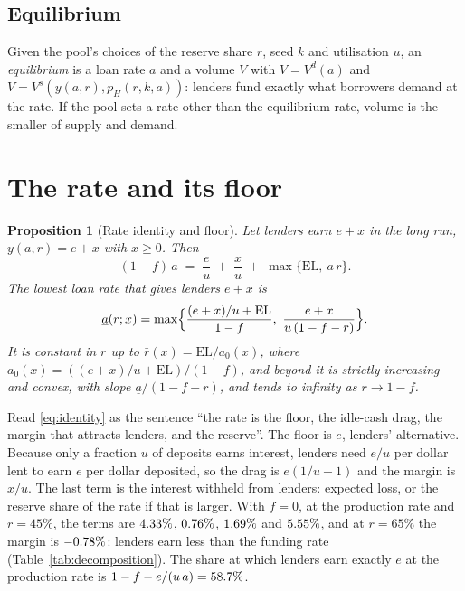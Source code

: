 \documentclass[preprint,11pt,authoryear]{elsarticle}
\newtheorem{proposition}{Proposition}
\theoremstyle{definition}
\newcommand{\EL}{\mathrm{EL}}
\begin{document}
\subsection{Equilibrium}

Given the pool's choices of the reserve share $r$, seed $k$ and utilisation $u$, an
\emph{equilibrium} is a loan rate $a$ and a volume $V$ with $V=V^d(a)$ and $V=V^s(y(a,r),p_H(r,k,a))$:
lenders fund exactly what borrowers demand at the rate. If the pool sets a rate other than the
equilibrium rate, volume is the smaller of supply and demand.

\section{The rate and its floor}\label{sec:floor}

\begin{proposition}[Rate identity and floor]\label{prop:identity}
Let lenders earn $e+x$ in the long run, $y(a,r)=e+x$ with $x\ge0$. Then
\begin{equation}\label{eq:identity}
  (1-f)\,a\;=\;\frac{e}{u}\;+\;\frac{x}{u}\;+\;\max\{\EL,\ a\,r\}.
\end{equation}
The lowest loan rate that gives lenders $e+x$ is
\begin{equation}\label{eq:floor}
  \underline a(r;x)=\max\Bigl\{\frac{(e+x)/u+\EL}{1-f},\ \frac{e+x}{u\,(1-f-r)}\Bigr\}.
\end{equation}
It is constant in $r$ up to $\bar r(x)=\EL/a_0(x)$, where $a_0(x)=((e+x)/u+\EL)/(1-f)$, and beyond it
is strictly increasing and convex, with slope $\underline a/(1-f-r)$, and tends to infinity as
$r\to 1-f$.
\end{proposition}

Read \eqref{eq:identity} as the sentence ``the rate is the floor, the idle-cash drag, the margin that
attracts lenders, and the reserve''. The floor is $e$, lenders' alternative. Because only a fraction $u$
of deposits earns interest, lenders need $e/u$ per dollar lent to earn $e$ per dollar deposited, so the
drag is $e(1/u-1)$ and the margin is $x/u$. The last term is the interest withheld from lenders: expected
loss, or the reserve share of the rate if that is larger. With $f=0$, at the production rate and $r=45\%$,
the terms are $4.33\%$, $0.76\%$, $1.69\%$ and $5.55\%$, and at
$r=65\%$ the margin is $-0.78\%$: lenders earn less than the funding rate
(Table~\ref{tab:decomposition}). The share at which lenders earn exactly $e$ at the production rate is
$1-f-e/(u\,a)=58.7\%$.
\end{document}
